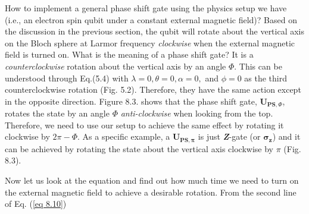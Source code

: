 \documentclass{article}
\newcommand{\bfit}[1]{\textit{\textbf{#1}}}
\begin{document}
How to implement a general phase shift gate using the physics setup we have (i.e., an electron spin
qubit under a constant external magnetic field)? Based on the discussion in the previous section,
the qubit will rotate about the vertical axis on the Bloch sphere at Larmor frequency
\textit{clockwise} when the external magnetic field is turned on. What is the meaning of a phase
shift gate? It is a \textit{counterclockwise} rotation about the vertical axis by an angle
$\Phi$. This can be understood through Eq.(5.4) with $\lambda=0,\theta=0,\alpha=0,$ and $\phi=0$ as the
third counterclockwise rotation (Fig. 5.2). Therefore, they have the same action except in the opposite
direction. Figure 8.3. shows that the phase shift gate, $\boldsymbol{U_{PS,\varPhi}}$, rotates the state
by an angle $\varPhi$ \textit{anti-clockwise} when looking from the top. Therefore, we need to use
our setup to achieve the same effect by rotating it clockwise by $2\pi-\varPhi$.
As a specific example, a $\boldsymbol{U_{PS,\pi}}$ is just \bfit{Z}-gate (or $\boldsymbol{\sigma_z}$) and
it can be achieved by rotating the state about the vertical axis clockwise by $\pi$ (Fig. 8.3).

Now let us look at the equation and find out how much time we need to turn on
the external magnetic field to achieve a desirable rotation. From the second line of
Eq. (\ref{eq 8.10})\\
\end{document}
